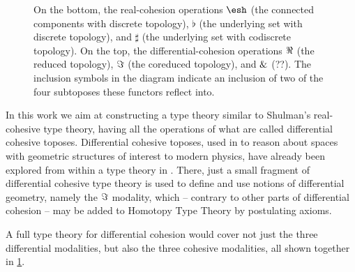 \documentclass{article}
\begin{document}
\begin{figure}
\begin{center}
\end{center}
\caption{On the bottom, the real-cohesion operations $\shape$ (the connected
  components with discrete topology), $\flat$ (the underlying set with discrete topology), and $\sharp$ (the underlying set with
  codiscrete topology). On the top, the differential-cohesion operations $\Re$
  (the reduced topology), $\Im$ (the coreduced topology), and $\&$ (??).
   The inclusion symbols in the diagram indicate an
  inclusion of two of the four subtoposes these functors reflect into. }
\label{fig:modalities}
\end{figure}

In this work we aim at constructing a type theory similar to Shulman's real-cohesive type theory,
having all the operations of what are called differential cohesive toposes.
Differential cohesive toposes, used in \citet{Schreiber2013} 
to reason about spaces with geometric structures of interest to modern physics,
have already been explored from within a type theory in \citet{Wellen2017}.
There, just a small fragment of differential cohesive type theory is used to define and 
use notions of differential geometry, namely the $\Im$ modality, which -- contrary to other parts of differential cohesion -- 
may be added to Homotopy Type Theory by postulating axioms. 

A full type theory for differential cohesion would cover
not just the three differential modalities, but also the three cohesive
modalities, all shown together in \cref{fig:modalities}.
\end{document}
